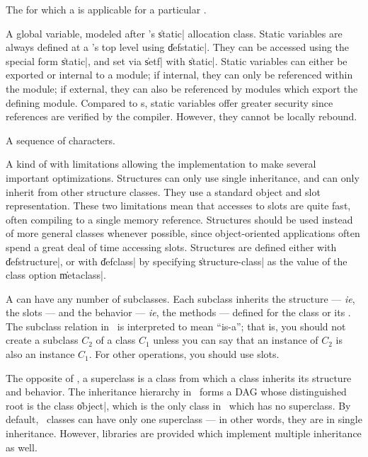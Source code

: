 \begin{description}
	{The  for which a  is applicable for
	a particular .}

	{A global variable, modeled after \langc's \|static|
	allocation class.  Static variables are always defined at a
	's top level using \|defstatic|.  They can be
	accessed using the special form \|static|, and set via \|setf|
	with \|static|.  Static variables can either be exported or
	internal to a module; if internal, they can only be referenced
	within the module; if external, they can also be referenced by
	modules which export the defining module.  Compared to
	s, static variables offer greater
	security since references are verified by the compiler.
	However, they cannot be locally rebound.}

	{A sequence of characters.}

	{A kind of  with limitations allowing the
	implementation to make several important optimizations.
	Structures can only use single inheritance, and can only
	inherit from other structure classes.  They use a standard
	object and slot representation.  These two limitations mean
	that accesses to slots are quite fast, often compiling to a
	single memory reference.  Structures should be used instead of
	more general classes whenever possible, since object-oriented
	applications often spend a great deal of time accessing slots.
	Structures are defined either with \|defstructure|, or with
	\|defclass| by specifying \|structure-class| as the value of
	the class option \|metaclass|.}

	{A  can have any number of subclasses. Each
	subclass inherits the structure --- {\em ie}, the slots ---
	and the behavior --- {\em ie}, the methods --- defined for the
	class or its .  The subclass relation in
	\Talk\ is interpreted to mean ``is-a''; that is, you should
	not create a subclass $C_2$ of a class $C_1$ unless you can
	say that an instance of $C_2$ is also an instance $C_1$.  For
	other operations, you should use slots.}

	{The opposite of , a superclass is a class from
	which a class inherits its structure and behavior.  The
	inheritance hierarchy in \Talk\ forms a DAG whose
	distinguished root is the class \|object|, which is the only
	class in \Talk\ which has no superclass.  By default, \Talk\
	classes can have only one superclass --- in other words, they
	are in single inheritance.  However, libraries are provided
	which implement multiple inheritance as well.}


\end{description}

